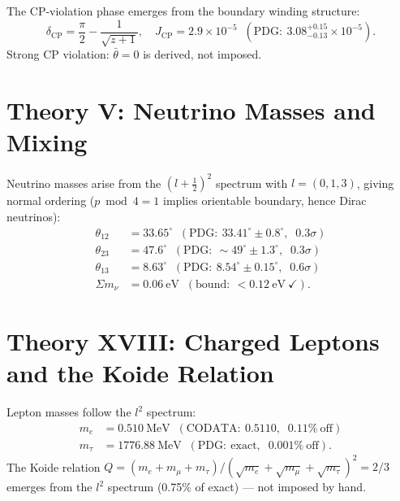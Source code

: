 \documentclass[12pt,oneside]{book}
\theoremstyle{definition}
\begin{document}
The CP-violation phase emerges from the boundary winding structure:
\begin{equation}
  \delta_{\mathrm{CP}} = \frac{\pi}{2} - \frac{1}{\sqrt{z+1}},
  \quad J_{\mathrm{CP}} = 2.9\times 10^{-5} \;\;(\mathrm{PDG:}~3.08^{+0.15}_{-0.13}\times10^{-5}).
\end{equation}
Strong CP violation: $\bar{\theta} = 0$ is derived, not imposed.

\section{Theory V: Neutrino Masses and Mixing}

Neutrino masses arise from the $(l+\tfrac{1}{2})^2$ spectrum with $l = (0, 1, 3)$,
giving normal ordering ($p\bmod 4 = 1$ implies orientable boundary, hence Dirac
neutrinos):
\begin{align}
  \theta_{12} &= 33.65^\circ \;\;(\mathrm{PDG:}~33.41^\circ\pm 0.8^\circ, \;\;0.3\sigma)\\
  \theta_{23} &= 47.6^\circ \;\;(\mathrm{PDG:}~\sim 49^\circ\pm 1.3^\circ, \;\;0.3\sigma)\\
  \theta_{13} &= 8.63^\circ \;\;(\mathrm{PDG:}~8.54^\circ\pm 0.15^\circ, \;\;0.6\sigma)\\
  \Sigma m_\nu &= 0.06~\mathrm{eV} \;\;(\mathrm{bound:}~< 0.12~\mathrm{eV}~\checkmark).
\end{align}

\section{Theory XVIII: Charged Leptons and the Koide Relation}

Lepton masses follow the $l^2$ spectrum:
\begin{align}
  m_e &= 0.510~\mathrm{MeV} \;\;(\mathrm{CODATA:}~0.5110, \;\;0.11\%~\text{off})\\
  m_\tau &= 1776.88~\mathrm{MeV} \;\;(\mathrm{PDG:}~\text{exact}, \;\;0.001\%~\text{off}).
\end{align}
The Koide relation $Q = (m_e + m_\mu + m_\tau)/(\sqrt{m_e}+\sqrt{m_\mu}+\sqrt{m_\tau})^2 = 2/3$
emerges from the $l^2$ spectrum (0.75\% of exact) --- not imposed by hand.
\end{document}
